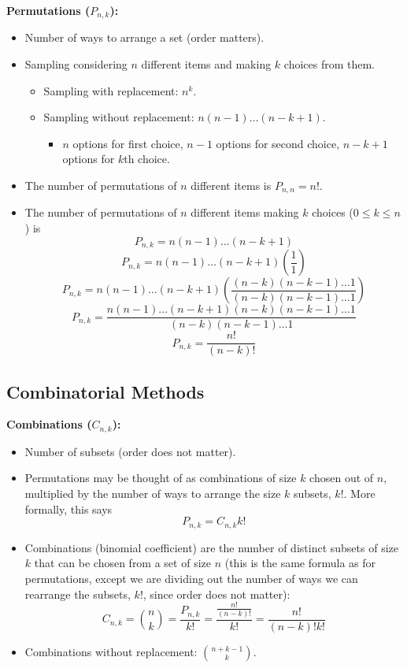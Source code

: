 \documentclass[11pt]{article}
\begin{document}
\textbf{Permutations ($P_{n,k}$):}
\begin{itemize}
    \item Number of ways to arrange a set (order matters).
    \item Sampling considering $n$ different items and making $k$ choices from them.
    \begin{itemize}
        \item Sampling with replacement: $n^k$.
        \item Sampling without replacement: $n(n-1) \ldots (n-k+1)$.
        \begin{itemize}
            \item $n$ options for first choice, $n-1$ options for second choice, $n-k+1$ 
            options for $k$th choice.
        \end{itemize}
    \end{itemize}
    
    \item The number of permutations of $n$ different items is $P_{n,n} = n$!.
    \item The number of permutations of $n$ different items making $k$ choices ($0 \le k \le 
    n$) is
        \[P_{n,k} = n(n-1) \ldots (n-k+1)\]
        \[P_{n,k} = n(n-1) \ldots (n-k+1) \left(\frac{1}{1}\right)\]
        \[P_{n,k} = n(n-1) \ldots (n-k+1) \left(\frac{(n-k)(n-k-1) \ldots 1}{(n-k)(n-k-1) 
        \ldots 1}\right)\]
        \[P_{n,k} = \frac{n(n-1) \ldots (n-k+1)(n-k)(n-k-1) \ldots 1}{(n-k)(n-k-1) \ldots 1}\]
        \[P_{n,k} = \frac{n!}{(n-k)!}\]
\end{itemize}

\subsection{Combinatorial Methods}
\textbf{Combinations ($C_{n,k}$):}
\begin{itemize}
    \item Number of subsets (order does not matter).
    \item Permutations may be thought of as combinations of size $k$ chosen out of $n$, 
    multiplied by the number of ways to arrange the size $k$ subsets, $k$!. More formally, this
    says 
    \[ P_{n,k} = C_{n,k} k!\]
    \item Combinations (binomial coefficient) are the number of distinct subsets of size $k$ 
    that can be chosen from a set of size $n$ (this is the same formula as for permutations,
    except we are dividing out the number of ways we can rearrange the subsets, $k$!, since 
    order does not matter): 
        \[C_{n,k} = {n \choose k} = \frac{P_{n,k}}{k!} = \frac{\frac{n!}{(n-k)!}}{k!} =  \frac{n!}{(n-k)!k!} \]
    \item Combinations without replacement: ${n+k-1 \choose k}$.
\end{itemize}
\end{document}
